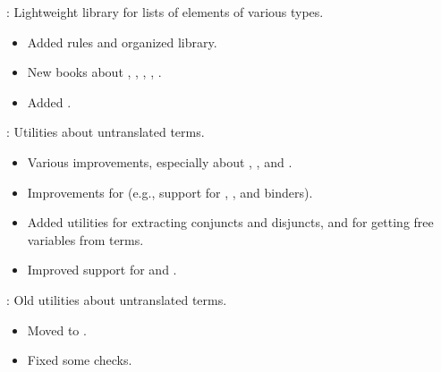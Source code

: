 
\begin{frame}

\implibtitle

:
Lightweight library for lists of elements of various types.
\begin{itemize}
\item Added rules and organized library.
\item New books about , , , , .
\item Added .

\end{itemize}

\end{frame}


\begin{frame}

\implibtitle

:
Utilities about untranslated terms.
\begin{itemize}
\item Various improvements, especially about , , and .
\item Improvements for  (e.g., support for \code{\&}, , and  binders).
\item Added utilities for extracting conjuncts and disjuncts, and for getting free variables from terms.
\item Improved support for  and .
\end{itemize}

:
Old utilities about untranslated terms.
\begin{itemize}
\item Moved to .
\item Fixed some checks.
\end{itemize}

\end{frame}


